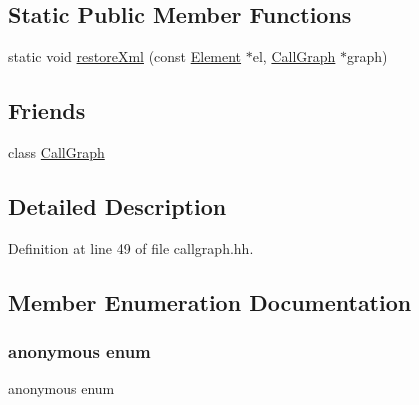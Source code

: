 \subsection*{Static Public Member Functions}
\begin{DoxyCompactItemize}
\item 
static void \mbox{\hyperlink{class_call_graph_node_a0b6c6ec59775a76b838b3d12c3a454f1}{restore\+Xml}} (const \mbox{\hyperlink{class_element}{Element}} $\ast$el, \mbox{\hyperlink{class_call_graph}{Call\+Graph}} $\ast$graph)
\end{DoxyCompactItemize}
\subsection*{Friends}
\begin{DoxyCompactItemize}
\item 
class \mbox{\hyperlink{class_call_graph_node_a05afb094c2637ded1f1b905b70d198a9}{Call\+Graph}}
\end{DoxyCompactItemize}


\subsection{Detailed Description}


Definition at line 49 of file callgraph.\+hh.



\subsection{Member Enumeration Documentation}
\mbox{\label{class_call_graph_node_a1b0706ea9d368e38db236437df844a1f}} 
\subsubsection{\texorpdfstring{anonymous enum}{anonymous enum}}
{\footnotesize\ttfamily anonymous enum}

